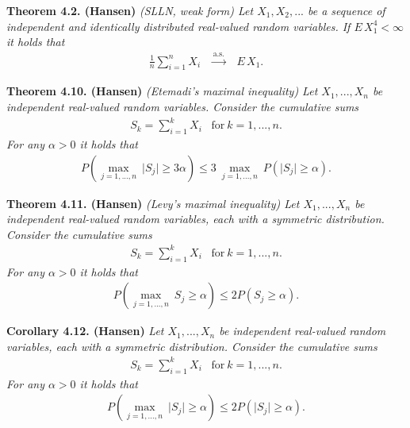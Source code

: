 \documentclass[a4paper,12pt,openany]{book}
\begin{document}
\textbf{Theorem 4.2. (Hansen)} \emph{(SLLN, weak form) Let \(X_1,X_2,...\) be a sequence of independent and identically distributed real-valued random variables. If \(E\, X_1^4<\infty\) it holds that}
\begin{align*}
    \frac{1}{n}\sum_{i=1}^n X_i \hspace{10pt}\stackrel{\text{a.s.}}{\to} \hspace{10pt}E\, X_1.\tag{4.3}
\end{align*}

\textbf{Theorem 4.10. (Hansen)} \emph{(Etemadi's maximal inequality) Let \(X_1,...,X_n\) be independent real-valued random variables. Consider the cumulative sums}
\begin{align*}
    S_k=\sum_{i=1}^kX_i\hspace{10pt}\text{for}\ k=1,..., n.
\end{align*}
\emph{For any \(\alpha >0\) it holds that}
\begin{align*}
    P\left(\max_{j=1,...,n}\ \vert S_j\vert\ge 3\alpha\right)\le 3\ \max_{j=1,...,n}\ P(\vert S_j\vert \ge \alpha).\tag{4.11}
\end{align*}

\textbf{Theorem 4.11. (Hansen)} \emph{(Levy's maximal inequality) Let \(X_1,...,X_n\) be independent real-valued random variables, each with a symmetric distribution. Consider the cumulative sums}
\begin{align*}
    S_k=\sum_{i=1}^kX_i\hspace{10pt}\text{for}\ k=1,..., n.
\end{align*}
\emph{For any \(\alpha>0\) it holds that}
\begin{align*}
    P\left(\max_{j=1,...,n}\ S_j\ge \alpha\right)\le 2 P(S_j\ge \alpha).\tag{4.13}
\end{align*}

\textbf{Corollary 4.12. (Hansen)} \emph{Let \(X_1,...,X_n\) be independent real-valued random variables, each with a symmetric distribution. Consider the cumulative sums}
\begin{align*}
    S_k=\sum_{i=1}^kX_i\hspace{10pt}\text{for}\ k=1,..., n.
\end{align*}
\emph{For any \(\alpha>0\) it holds that}
\begin{align*}
    P\left(\max_{j=1,...,n}\ \vert S_j\vert\ge \alpha\right)\le 2 P(\vert S_j\vert\ge \alpha).\tag{4.14}
\end{align*}
\end{document}
